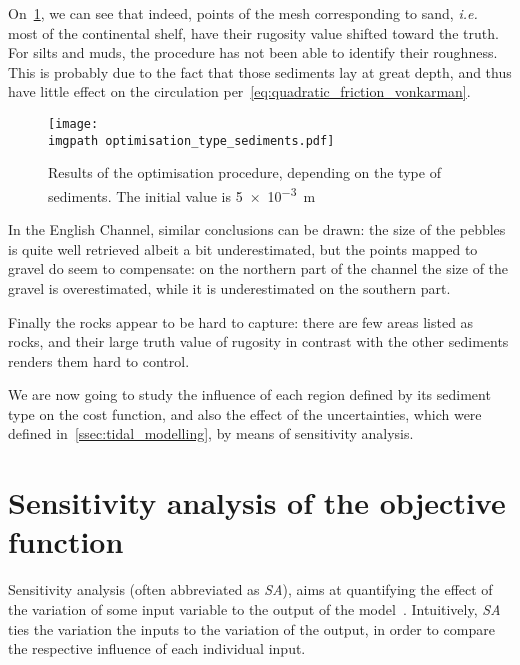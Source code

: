 \documentclass[../../Main_ManuscritThese.tex]{subfiles}
\newcommand\imgpath{/home/victor/acadwriting/Manuscrit/Text/Chapter5/img/}
\begin{document}
On~\cref{fig:optimisation_type_sediments}, we can see that indeed,
points of the mesh corresponding to sand, \emph{i.e.} most of the
continental shelf, have their rugosity value shifted toward the truth.
For silts and muds, the procedure has not been able to identify their
roughness. This is probably due to the fact that those sediments lay
at great depth, and thus have little effect on the circulation
per~\cref{eq:quadratic_friction_vonkarman}.
\begin{figure}[ht]
  \centering
  \texttt{[image: \\imgpath optimisation\_type\_sediments.pdf]}
  \caption[Final values of the optimisation procedure, based on the sediment type]{\label{fig:optimisation_type_sediments} Results of the
    optimisation procedure, depending on the type of sediments. The
    initial value is \SI{5e-3}{\meter}}
\end{figure}

In the English Channel, similar conclusions can be drawn: the size of
the pebbles is quite well retrieved albeit a bit
underestimated, but the points mapped to gravel do
seem to compensate: on the northern part of the channel the size of
the gravel is overestimated, while it is underestimated on the
southern part.

Finally the rocks appear to be hard to capture: there are few areas
listed as rocks, and their large truth value of rugosity in contrast
with the other sediments renders them hard to
control.%

We are now going to study the influence of each region defined by its
sediment type on the cost function, and also the effect of the
uncertainties, which were defined in~\cref{ssec:tidal_modelling}, by
means of sensitivity analysis.



\section{Sensitivity analysis of the objective function}
\label{sec:sensitivity-analysis}
Sensitivity analysis (often abbreviated as \emph{SA}), aims at
quantifying the effect of the variation of some input variable to the
output of the model~\cite{iooss_revue_2011,janon_analyse_2012}.
Intuitively, \emph{SA} ties the variation the inputs to
the variation of the output, in order to compare the respective
influence of each individual input.
\end{document}
